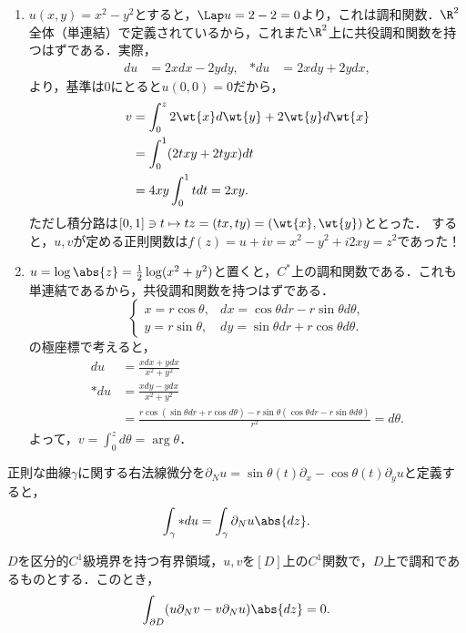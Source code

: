 \documentclass[uplatex, dvipdfmx]{jsreport}
\begin{document}
\begin{example}[共役調和関数]\mbox{}
    \begin{enumerate}
        \item $u(x,y)=x^2-y^2$とすると，$\Lap u=2-2=0$より，これは調和関数．$\R^2$全体（単連結）で定義されているから，これまた$\R^2$上に共役調和関数を持つはずである．実際，
        \begin{align*}
            du&=2xdx-2ydy,&*du&=2xdy+2ydx,
        \end{align*}
        より，基準は$0$にとると$u(0,0)=0$だから，
        \begin{align*}
            v&=\int^z_02\wt{x}d\wt{y}+2\wt{y}d\wt{x}\\
            &=\int^1_0(2txy+2tyx)dt\\
            &=4xy\int^1_0tdt=2xy.
        \end{align*}
        ただし積分路は$[0,1]\ni t\mapsto tz=(tx,ty)=(\wt{x},\wt{y})$ととった．
        すると，$u,v$が定める正則関数は$f(z)=u+iv=x^2-y^2+i2xy=z^2$であった！
        \item $u=\log\abs{z}=\frac{1}{2}\log(x^2+y^2)$と置くと，$C^*$上の調和関数である．これも単連結であるから，共役調和関数を持つはずである．
        \[\begin{cases}
            x=r\cos\theta,&dx=\cos\theta dr-r\sin\theta d\theta,\\
            y=r\sin\theta,&dy=\sin\theta dr+r\cos\theta d\theta.
        \end{cases}\]
        の極座標で考えると，
        \begin{align*}
            du&=\frac{xdx+ydx}{x^2+y^2}\\
            *du&=\frac{xdy-ydx}{x^2+y^2}\\
            &=\frac{r\cos(\sin\theta dr+r\cos d\theta)-r\sin\theta(\cos\theta dr-r\sin\theta d\theta)}{r^2}=d\theta.
        \end{align*}
        よって，$v=\int^z_0d\theta=\arg\theta$．
    \end{enumerate}
\end{example}

\begin{notation}[Hodge双対の幾何学的意味]
    正則な曲線$\gamma$に関する右法線微分を$\partial_Nu=\sin\theta(t)\partial_x-\cos\theta(t)\partial_yu$と定義すると，
    \[\int_\gamma *du=\int_{\gamma}\partial_Nu\abs{dz}.\]
\end{notation}

\begin{theorem}[Greenの公式]
    $D$を区分的$C^1$級境界を持つ有界領域，$u,v$を$[D]$上の$C^1$関数で，$D$上で調和であるものとする．このとき，
    \[\int_{\partial D}(u\partial_Nv-v\partial_Nu)\abs{dz}=0.\]
\end{theorem}
\end{document}
